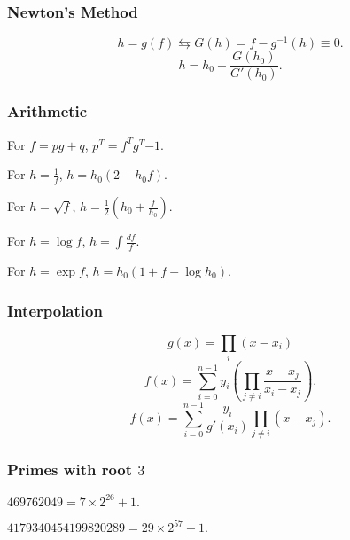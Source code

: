 \subsubsection{Newton's Method}
$$h=g(f) \leftrightarrows G(h)=f-g^{-1}(h)\equiv 0.$$
$$h=h_0-\frac{G(h_0)}{G'(h_0)}.$$

\subsubsection{Arithmetic}

For $f=pg+q$, $p^T=f^Tg^T{-1}$.

For $h=\frac1{f}$, $h=h_0(2-h_0f)$.

For $h=\sqrt{f}$, $h=\frac12(h_0+\frac{f}{h_0})$.

For $h=\log f$, $h=\int\frac{df}{f}$.

For $h=\exp f$, $h=h_0(1+f-\log h_0)$.

\subsubsection{Interpolation}

$$g(x)=\prod_{i}(x-x_i)$$
$$f(x)=\sum_{i=0}^{n-1}y_i(\prod_{j\ne i}\frac{x-x_j}{x_i-x_j}).$$
$$f(x)=\sum_{i=0}^{n-1}\frac{y_i}{g'(x_i)}\prod_{j\ne i}(x-x_j).$$

\subsubsection{Primes with root $3$}
$469762049=7\times2^{26} + 1.$

\noindent $4179340454199820289=29\times2^{57}+1.$
